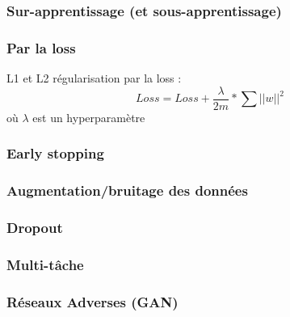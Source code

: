 \begin{frame}
  \frametitle{Sur-apprentissage (et sous-apprentissage)}
\end{frame}

\begin{frame}
  \frametitle{Par la loss}
  L1 et L2 régularisation par la loss : \\
  \[
  Loss = Loss + \frac{\lambda}{2m}*\sum||w||^2
  \]
  où $\lambda$ est un hyperparamètre
\end{frame}

\begin{frame}
  \frametitle{Early stopping}
\end{frame}

\begin{frame}
  \frametitle{Augmentation/bruitage des données}
\end{frame}

\begin{frame}
  \frametitle{Dropout}
\end{frame}

\begin{frame}
  \frametitle{Multi-tâche}
\end{frame}

\begin{frame}
  \frametitle{Réseaux Adverses (GAN)}
\end{frame}
